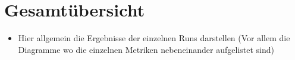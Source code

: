 \section{Gesamtübersicht}\label{sec:gesamtubersicht}

\begin{itemize}
    \item Hier allgemein die Ergebnisse der einzelnen Runs darstellen (Vor allem die Diagramme wo die einzelnen Metriken nebeneinander aufgelistet sind)
\end{itemize}